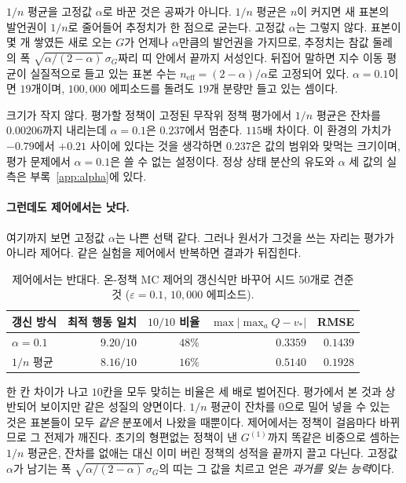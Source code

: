 \documentclass[11pt,a4paper]{article}
\begin{document}
$1/n$ 평균을 고정값 $\alpha$로 바꾼 것은 공짜가 아니다. $1/n$ 평균은 $n$이 커지면 새 표본의 발언권이
$1/n$로 줄어들어 추정치가 한 점으로 굳는다. 고정값 $\alpha$는 그렇지 않다. 표본이 몇 개 쌓였든 새로
오는 $G$가 언제나 $\alpha$만큼의 발언권을 가지므로, 추정치는 참값 둘레의 폭
$\sqrt{\alpha/(2-\alpha)}\,\sigma_G$짜리 띠 안에서 끝까지 서성인다. 뒤집어 말하면 지수 이동 평균이
실질적으로 들고 있는 표본 수는 $n_{\text{eff}} = (2-\alpha)/\alpha$로 고정되어 있다. $\alpha=0.1$이면
$19$개이며, $100{,}000$ 에피소드를 돌려도 $19$개 분량만 들고 있는 셈이다.

크기가 작지 않다. 평가할 정책이 고정된 무작위 정책 평가에서 $1/n$ 평균은 잔차를 $0.00206$까지
내리는데 $\alpha=0.1$은 $0.237$에서 멈춘다. $115$배 차이다. 이 환경의 가치가 $-0.79$에서 $+0.21$
사이에 있다는 것을 생각하면 $0.237$은 값의 범위와 맞먹는 크기이며, 평가 문제에서 $\alpha=0.1$은 쓸
수 없는 설정이다. 정상 상태 분산의 유도와 $\alpha$ 세 값의 실측은 부록~\ref{app:alpha}에 있다.

\paragraph{그런데도 제어에서는 낫다.}
여기까지 보면 고정값 $\alpha$는 나쁜 선택 같다. 그러나 원서가 그것을 쓰는 자리는 평가가 아니라
제어다. 같은 실험을 제어에서 반복하면 결과가 뒤집힌다.

\begin{table}[htbp]
\centering
\caption{제어에서는 반대다. 온-정책 MC 제어의 갱신식만 바꾸어 시드 $50$개로 견준 것
($\varepsilon=0.1$, $10{,}000$ 에피소드).}
\label{tab:alpha-control}
\small
\begin{tabular}{@{}lrrrr@{}}
\toprule
갱신 방식 & 최적 행동 일치 & $10/10$ 비율 & $\max|\max_a Q - v_*|$ & RMSE \\
\midrule
$\alpha=0.1$ & $9.20/10$ & $48\%$ & $0.3359$ & $0.1439$ \\
$1/n$ 평균   & $8.16/10$ & $16\%$ & $0.5140$ & $0.1928$ \\
\bottomrule
\end{tabular}
\end{table}

한 칸 차이가 나고 $10$칸을 모두 맞히는 비율은 세 배로 벌어진다. 평가에서 본 것과 상반되어
보이지만 같은 성질의 양면이다. $1/n$ 평균이 잔차를 $0$으로 밀어 넣을 수 있는 것은 표본들이 모두 \emph{같은}
분포에서 나왔을 때뿐이다. 제어에서는 정책이 걸음마다 바뀌므로 그 전제가 깨진다. 초기의 형편없는
정책이 낸 $G^{(1)}$까지 똑같은 비중으로 셈하는 $1/n$ 평균은, 잔차를 없애는 대신 이미 버린 정책의
성적을 끝까지 끌고 다닌다. 고정값 $\alpha$가 남기는 폭 $\sqrt{\alpha/(2-\alpha)}\,\sigma_G$의 띠는
그 값을 치르고 얻은 \emph{과거를 잊는 능력}이다.
\end{document}
